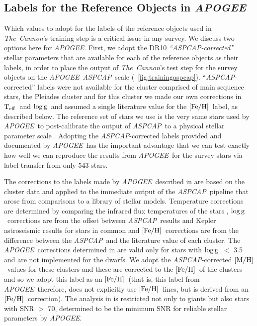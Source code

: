 \documentclass[12pt, preprint]{aastex}
\newcommand{\tc}{\textsl{The~Cannon}}
\newcommand{\apogee}{\textsl{APOGEE}}
\newcommand{\aspcap}{\textsl{ASPCAP}}
\newcommand{\teff}{\mbox{$\rm T_{eff}$}}
\newcommand{\feh}{\mbox{$\rm [Fe/H]$}}
\newcommand{\mh}{\mbox{$\rm [M/H]$}}
\newcommand{\logg}{\mbox{$\rm \log g$}}
\begin{document}
\subsection{Labels for the Reference Objects in \apogee}
\label{sec:ApogeeRefLabels}

Which values to adopt for the labels of the reference objects used in \tc 's training step is a critical issue
in any survey. We discuss two options here for \apogee . 
First, we adopt the DR10 \textit{``\aspcap-corrected''} stellar parameters \citep{Meszaros2013} that are available for each of the reference objects as their labels, in order to place the output of \tc 's test step for the survey objects on the \apogee\ \aspcap\ scale (\figurename~\ref{fig:trainingaspcap}). ``\aspcap-corrected'' labels were not available for the cluster comprised of main sequence stars, the Pleiades cluster and for this cluster we made our own corrections in \teff\ and \logg\ and assumed a single literature value for the \feh\ label, as described below. 
The reference set of stars we use is the very same stars used by \apogee\ to post-calibrate the output of \aspcap\ to a physical stellar parameter scale \citep{Meszaros2013}.
Adopting the \aspcap-corrected labels provided and documented by \apogee\ has the important advantage 
that we can test exactly how well we can reproduce the results from \apogee\ for the survey stars via label-transfer from only 543 stars.

The corrections to the labels made by \apogee\ described in \citet{Meszaros2013} are based on the cluster data and applied to the immediate output of the \aspcap\ pipeline that arose from comparisons to a library of stellar models.
Temperature corrections are determined by comparing the infrared flux temperatures of the stars \citep{gonzalez2009}, \logg\ corrections are from the offset between \aspcap\ results and Kepler astroseismic results for stars in common and \feh\ corrections are from the difference between the \aspcap\ and  the literature value of each cluster.  
The \apogee\ corrections determined in \citet{Meszaros2013} are valid only for stars with \logg\ $<$ 3.5 and are not implemented for the dwarfs.  We adopt the \aspcap-corrected \mh\ values for these clusters and these are corrected to the \feh\ of the clusters and so we adopt this label as an \feh\ (that is, this label from \apogee\ therefore, does not explicitly use \feh\ lines, but is derived from an \feh\ correction). 
The analysis in \citet{Meszaros2013} is restricted not only to giants but also stars with SNR $>$ 70, determined to be the minimum SNR for reliable stellar parameters by \apogee.
\end{document}
